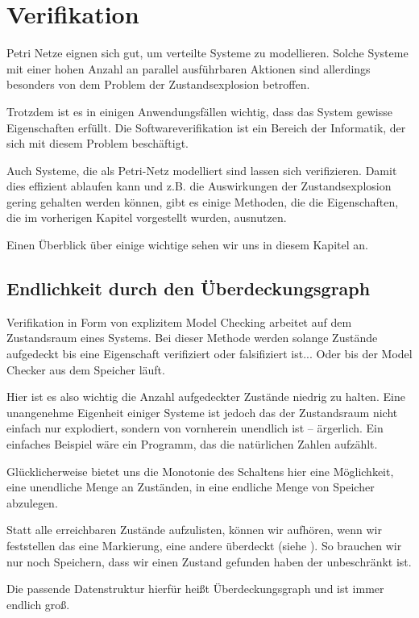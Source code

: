 \chapter{Verifikation}
Petri Netze eignen sich gut, um verteilte Systeme zu modellieren.
Solche Systeme mit einer hohen Anzahl an parallel ausführbaren Aktionen sind allerdings besonders von dem Problem der Zustandsexplosion betroffen.

Trotzdem ist es in einigen Anwendungsfällen wichtig, dass das System gewisse Eigenschaften erfüllt.
Die Softwareverifikation ist ein Bereich der Informatik, der sich mit diesem Problem beschäftigt.

Auch Systeme, die als Petri-Netz modelliert sind lassen sich verifizieren.
Damit dies effizient ablaufen kann und z.B. die Auswirkungen der Zustandsexplosion gering gehalten werden können, gibt es einige Methoden, die die Eigenschaften, die im vorherigen Kapitel vorgestellt wurden, ausnutzen.

Einen Überblick über einige wichtige sehen wir uns in diesem Kapitel an.

\section{Endlichkeit durch den Überdeckungsgraph}
Verifikation in Form von explizitem Model Checking arbeitet auf dem Zustandsraum eines Systems.
Bei dieser Methode werden solange Zustände aufgedeckt bis eine Eigenschaft verifiziert oder falsifiziert ist... Oder bis der Model Checker aus dem Speicher läuft.

Hier ist es also wichtig die Anzahl aufgedeckter Zustände niedrig zu halten.
Eine unangenehme Eigenheit einiger Systeme ist jedoch das der Zustandsraum nicht einfach nur explodiert, sondern von vornherein unendlich ist -- ärgerlich.
Ein einfaches Beispiel wäre ein Programm, das die natürlichen Zahlen aufzählt.

Glücklicherweise bietet uns die Monotonie des Schaltens hier eine Möglichkeit, eine unendliche Menge an Zuständen, in eine endliche Menge von Speicher abzulegen.

Statt alle erreichbaren Zustände aufzulisten, können wir aufhören, wenn wir feststellen das eine Markierung, eine andere überdeckt (siehe \cite{?2.2}).
So brauchen wir nur noch Speichern, dass wir einen Zustand gefunden haben der unbeschränkt ist.

Die passende Datenstruktur hierfür heißt Überdeckungsgraph und ist immer endlich groß.

